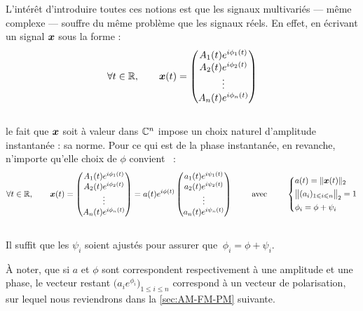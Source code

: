 
L'intérêt d'introduire toutes ces notions est que les signaux multivariés --- même complexe --- souffre du même problème que les signaux réels. 
En effet, en écrivant un signal $\boldsymbol{x}$ sous la forme :
\[\forall t\in\mathbb{R},\qquad 
\boldsymbol{x}(t) = \begin{pmatrix} A_1(t)e^{i\phi_1(t)} \\ A_2(t)e^{i\phi_2(t)} \\ \vdots \\ A_n(t)e^{i\phi_n(t)}
\end{pmatrix}\]
\\
le fait que $\boldsymbol{x}$ soit à valeur dans $\mathbb{C}^n$ impose un choix naturel d'amplitude instantanée : sa norme. Pour ce qui est de la phase instantanée, en revanche, n'importe qu'elle choix de $\phi$ convient \apriori~:
\[\forall t\in\mathbb{R},\qquad 
\boldsymbol{x}(t) = \begin{pmatrix} A_1(t)e^{i\phi_1(t)} \\ A_2(t)e^{i\phi_2(t)} \\ \vdots \\ A_n(t)e^{i\phi_n(t)} \end{pmatrix}
= a(t)e^{i\phi(t)}\begin{pmatrix} a_1(t)e^{i\psi_1(t)} \\ a_2(t)e^{i\psi_2(t)} \\ \vdots \\ a_n(t)e^{i\psi_n(t)} \end{pmatrix}
\qquad\text{ avec }\qquad 
\left\{ \begin{aligned}
	& a(t) = \| \boldsymbol{x}(t) \|_2 \\
	& \big\|(a_i)_{1\leqslant i\leqslant n}\big\|_2 = 1 \\
	& \phi_i = \phi + \psi_i \end{aligned}\right.\]
\\
Il suffit que les $\psi_i$ soient ajustés pour assurer que $\ \phi_i = \phi + \psi_i$.
\\
\begin{remarque}
	À noter, que si $a$ et $\phi$ sont correspondent respectivement à une amplitude et une phase, le vecteur restant $\big( a_ie^{\phi_i} \big)_{1\leq i\leq n}$ correspond à un vecteur de polarisation, sur lequel nous reviendrons dans la \cref{sec:AM-FM-PM} suivante.
\end{remarque}




